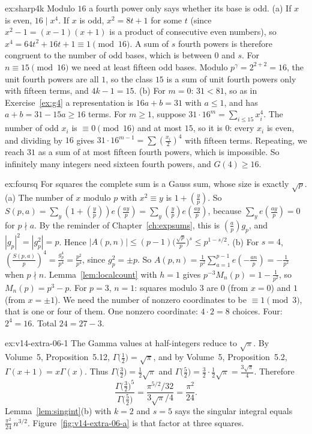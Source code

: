 \begin{solution}{ex:sharp4k}
\idea Modulo $16$ a fourth power only says whether its base is odd.
\writeup (a) If $x$ is even, $16\mid x^4$. If $x$ is odd, $x^2=8t+1$ for some $t$ (since $x^2-1=(x-1)(x+1)$ is a product of consecutive even numbers), so $x^4=64t^2+16t+1\equiv1\pmod{16}$. A sum of $s$ fourth powers is therefore congruent to the number of odd bases, which is between $0$ and $s$. For $n\equiv15\pmod{16}$ we need at least fifteen odd bases. Modulo $p^\gamma=2^{2+2}=16$, the unit fourth powers are all $1$, so the class $15$ is a sum of unit fourth powers only with fifteen terms, and $4k-1=15$.
(b) For $m=0$: $31<81$, so as in Exercise~\ref{ex:g4} a representation is $16a+b=31$ with $a\le1$, and has $a+b=31-15a\ge16$ terms. For $m\ge1$, suppose $31\cdot16^m=\sum_{i\le15}x_i^4$. The number of odd $x_i$ is $\equiv0\pmod{16}$ and at most $15$, so it is $0$: every $x_i$ is even, and dividing by $16$ gives $31\cdot16^{m-1}=\sum(\frac{x_i}2)^4$ with fifteen terms. Repeating, we reach $31$ as a sum of at most fifteen fourth powers, which is impossible. So infinitely many integers need sixteen fourth powers, and $G(4)\ge16$.
\end{solution}
\begin{solution}{ex:foursq}
\idea For squares the complete sum is a Gauss sum, whose size is exactly $\sqrt p$.
\writeup (a) The number of $x$ modulo $p$ with $x^2\equiv y$ is $1+(\frac yp)$. So $S(p,a)=\sum_y(1+(\frac yp))e(\frac{ay}p)=\sum_y(\frac yp)e(\frac{ay}p)$, because $\sum_ye(\frac{ay}p)=0$ for $p\nmid a$. By the reminder of Chapter~\ref{ch:expsums}, this is $(\frac ap)g_p$, and $|g_p|^2=|g_p^2|=p$. Hence $|A(p,n)|\le(p-1)\bigl(\frac{\sqrt p}p\bigr)^s\le p^{1-s/2}$.
(b) For $s=4$, $(\frac{S(p,a)}p)^4=\frac{g_p^4}{p^4}=\frac{p^2}{p^4}$, since $g_p^2=\pm p$. So $A(p,n)=\frac1{p^2}\sum_{a=1}^{p-1}e(-\frac{an}p)=-\frac1{p^2}$ when $p\nmid n$. Lemma~\ref{lem:localcount} with $h=1$ gives $p^{-3}M_n(p)=1-\frac1{p^2}$, so $M_n(p)=p^3-p$. For $p=3$, $n=1$: squares modulo $3$ are $0$ (from $x=0$) and $1$ (from $x=\pm1$). We need the number of nonzero coordinates to be $\equiv1\pmod3$, that is one or four of them. One nonzero coordinate: $4\cdot2=8$ choices. Four: $2^4=16$. Total $24=27-3$.
\end{solution}
\begin{solution}{ex:v14-extra-06-1}
\idea The Gamma values at half-integers reduce to $\sqrt\pi$.
\writeup By Volume~5, Proposition~5.12, $\Gamma\bigl(\frac12\bigr)=\sqrt\pi$, and by Volume~5, Proposition~5.2, $\Gamma(x+1)=x\Gamma(x)$. Thus $\Gamma\bigl(\frac32\bigr)=\frac12\sqrt\pi$ and $\Gamma\bigl(\frac52\bigr)=\frac32\cdot\frac12\sqrt\pi=\frac{3\sqrt\pi}4$. Therefore
\[
\frac{\Gamma\bigl(\frac32\bigr)^5}{\Gamma\bigl(\frac52\bigr)}=\frac{\pi^{5/2}/32}{3\sqrt\pi/4}=\frac{\pi^2}{24}.
\]
Lemma~\ref{lem:singint}(b) with $k=2$ and $s=5$ says the singular integral equals $\frac{\pi^2}{24}\,n^{3/2}$. Figure~\ref{fig:v14-extra-06-a} is that factor at three squares.
\end{solution}

